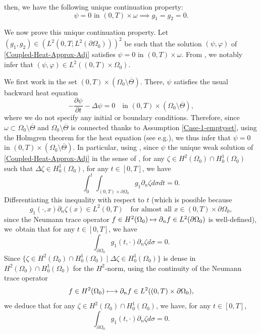 \documentclass[10pt,a4paper]{amsart}
\providecommand{\eg}{e.g.}
\newcommand\mto{\mathchoice{\longmapsto}{\mapsto}{\mapsto}{\mapsto}}
\theoremstyle{definition}
\begin{document}
then, we have the following unique continuation property:
\begin{equation}
\label{UC-Adj-Coupled}
\psi = 0 \text{ in } (0,T) \times \omega \implies g_1 = g_2 = 0.
\end{equation}

We now prove this unique continuation property. Let $(g_1, g_2) \in (L^2(0,T; L^2(\partial\Omega_0)))^2$ be such that the solution $(\psi, \varphi)$ of \eqref{Coupled-Heat-Approx-Adj} satisfies $\psi = 0$ in $(0,T) \times \omega$. From \cite[(15.17--18), p.\,86]{LionsMagenes2}, we notably infer that $(\psi,\varphi)\in L^2((0,T)\times\Omega_0)$.

We first work in the set $(0,T) \times (\Omega_0 \setminus \overline{\Theta})$. There, $\psi$ satisfies the usual backward heat equation
\[
-\dfrac{\partial \psi}{\partial t}-\Delta \psi =0\quad\text{in }(0,T) \times(\Omega_0 \setminus \overline{\Theta}),
\]
where we do not specify any initial or boundary conditions.
Therefore, since $\omega \subset \Omega_0\setminus {\overline{\Theta}}$ and $\Omega_0\setminus {\overline{\Theta}}$ is connected thanks to Assumption \eqref{Case-1-emptyset}, using the Holmgren theorem for the heat equation (see \eg \cite[\S8.6 \& Th.\,8.6.5]{Hormander-2003}), we thus infer that $\psi = 0$ in $(0,T) \times (\Omega_0 \setminus \overline{\Theta})$.
In particular, using \cite[Prop.\,7.1.3]{TWBook}, since $\psi$ the unique weak solution of \eqref{Coupled-Heat-Approx-Adj} in the sense of \cite[Def.\,7.1.2, p.\,342]{TWBook}, for any $\zeta\in H^2(\Omega_0)\cap H^1_0(\Omega_0)$ such that $\Delta \zeta \in H^1_0(\Omega_0)$, for any $t\in [0,T]$, we have
\[
\int_0^t\int_{(0,T)\times\partial\Omega_0}g_1\partial_n \zeta d\sigma dt =0.
\]
Differentiating this inequality with respect to $t$ (which is possible because
\[
g_1(\cdot,x)\partial_n \zeta(x) \in L^2(0,T)\quad \text{for almost all $x\in (0,T)\times\partial\Omega_0$},
\]
since the Neumann trace operator $f\in H^2(\Omega_0) \mto \partial_n f\in L^2(\partial\Omega_0)$ is well-defined), we~obtain that for any $t\in [0,T]$, we have
\[
\int_{\partial\Omega_0}g_1(t,\cdot)\partial_n \zeta d\sigma =0.
\]
Since $\{\zeta \in H^2(\Omega_0)\cap H^1_0(\Omega_0)\mid \Delta \zeta \in H^1_0(\Omega_0)\}$ is dense in $H^2(\Omega_0)\cap H^1_0(\Omega_0)$ for the $H^2$-norm, using the continuity of the Neumann trace operator
\[
f\in H^2(\Omega_0) \mto \partial_n f\in L^2((0,T)\times\partial\Omega_0),
\]
we deduce that for any $\zeta\in H^2(\Omega_0)\cap H^1_0(\Omega_0)$, we have, for any $t\in [0,T]$,
\[
\int_{\partial\Omega_0}g_1(t,\cdot)\partial_n \zeta d\sigma =0.
\]
\end{document}
